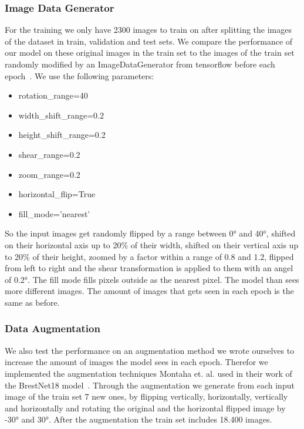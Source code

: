 \documentclass[sn-mathphys,Numbered]{sn-jnl}%
\theoremstyle{thmstyleone}%
\theoremstyle{thmstyletwo}%
\theoremstyle{thmstylethree}%
\begin{document}
\subsubsection{Image Data Generator}
\label{ImageDataGenerator}
For the training we only have 2300 images to train on after splitting the images of the dataset in train, validation and test sets. We compare the performance of our model on these original images in the train set to the images of the train set randomly modified by an ImageDataGenerator from tensorflow before each epoch~\cite{IDG}. We use the following parameters:\\
\begin{itemize}
\item rotation\_range=40
\item width\_shift\_range=0.2
\item height\_shift\_range=0.2
\item shear\_range=0.2
\item zoom\_range=0.2
\item horizontal\_flip=True
\item fill\_mode='nearest'
\end{itemize}
So the input images get randomly flipped by a range between 0° and 40°, shifted on their horizontal axis up to 20\% of their width, shifted on their vertical axis up to 20\% of their height, zoomed by a factor within a range of 0.8 and 1.2, flipped from left to right and the shear transformation is applied to them with an angel of 0.2°. The fill mode fills pixels outside as the nearest pixel. The model than sees more different images. The amount of images that gets seen in each epoch is the same as before.
\subsubsection{Data Augmentation}
\label{DataAugmentation}
We also test the performance on an augmentation method we wrote ourselves to increase the amount of images the model sees in each epoch. Therefor we implemented the augmentation techniques Montaha et. al. used in their work of the BrestNet18 model~\cite{Montaha2021}. Through the augmentation we generate from each input image of the train set 7 new ones, by flipping vertically, horizontally, vertically and horizontally and rotating the original and the horizontal flipped image by -30° and 30°. After the augmentation the train set includes 18.400 images.
\end{document}
